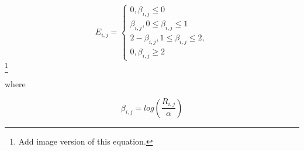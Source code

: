 \begin{equation}
    E_{i,j} = 
    \begin{cases}
        0, 
        \beta_{i,j} \le 0 \\
        \beta_{i,j}, 
        0 \le \beta_{i,j} \le 1 \\    
        2 - \beta_{i,j}, 
        1 \le \beta_{i,j} \le 2, \\
        0, 
        \beta_{i,j} \ge 2
    \end{cases}
\end{equation}\footnote{Add image version of this equation.}

where 

\begin{equation}
    \beta_{i,j} = log(\frac{R_{i,j}}{\alpha})
\end{equation}